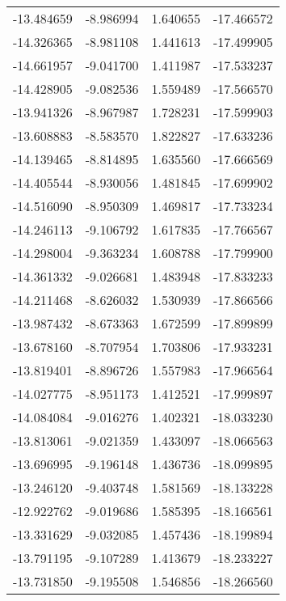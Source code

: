 \begin{tabular}{rrrr}
      -13.484659 &        -8.986994 &    1.640655 & -17.466572 \\
      -14.326365 &        -8.981108 &    1.441613 & -17.499905 \\
      -14.661957 &        -9.041700 &    1.411987 & -17.533237 \\
      -14.428905 &        -9.082536 &    1.559489 & -17.566570 \\
      -13.941326 &        -8.967987 &    1.728231 & -17.599903 \\
      -13.608883 &        -8.583570 &    1.822827 & -17.633236 \\
      -14.139465 &        -8.814895 &    1.635560 & -17.666569 \\
      -14.405544 &        -8.930056 &    1.481845 & -17.699902 \\
      -14.516090 &        -8.950309 &    1.469817 & -17.733234 \\
      -14.246113 &        -9.106792 &    1.617835 & -17.766567 \\
      -14.298004 &        -9.363234 &    1.608788 & -17.799900 \\
      -14.361332 &        -9.026681 &    1.483948 & -17.833233 \\
      -14.211468 &        -8.626032 &    1.530939 & -17.866566 \\
      -13.987432 &        -8.673363 &    1.672599 & -17.899899 \\
      -13.678160 &        -8.707954 &    1.703806 & -17.933231 \\
      -13.819401 &        -8.896726 &    1.557983 & -17.966564 \\
      -14.027775 &        -8.951173 &    1.412521 & -17.999897 \\
      -14.084084 &        -9.016276 &    1.402321 & -18.033230 \\
      -13.813061 &        -9.021359 &    1.433097 & -18.066563 \\
      -13.696995 &        -9.196148 &    1.436736 & -18.099895 \\
      -13.246120 &        -9.403748 &    1.581569 & -18.133228 \\
      -12.922762 &        -9.019686 &    1.585395 & -18.166561 \\
      -13.331629 &        -9.032085 &    1.457436 & -18.199894 \\
      -13.791195 &        -9.107289 &    1.413679 & -18.233227 \\
      -13.731850 &        -9.195508 &    1.546856 & -18.266560 \\

\end{tabular}
